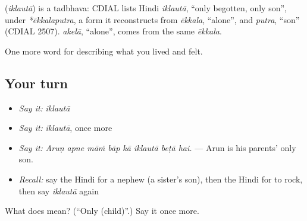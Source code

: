 \begin{cousinweb}
\textbf{} (\emph{iklautā}) is a tadbhava: CDIAL lists Hindi \emph{iklautā}, \textquotedblleft{}only begotten, only son\textquotedblright{}, under \emph{*ēkkalaputra}, a form it reconstructs from \emph{ēkkala}, \textquotedblleft{}alone\textquotedblright{}, and \emph{putra}, \textquotedblleft{}son\textquotedblright{} (CDIAL 2507). \emph{akelā}, \textquotedblleft{}alone\textquotedblright{}, comes from the same \emph{ēkkala}.
\end{cousinweb}

\begin{grammarlens}[title={What you've built}]
One more word for describing what you lived and felt.
\end{grammarlens}

\subsection*{Your turn}
\begin{itemize}
\raggedright
  \item \emph{Say it:} \emph{iklautā}
  \item \emph{Say it:} \emph{iklautā}, once more
  \item \emph{Say it:} \emph{Aruṇ apne māṁ bāp kā iklautā beṭā hai.} — Arun is his parents' only son.
  \item \emph{Recall:} say the Hindi for a nephew (a sister's son), then the Hindi for to rock, then say \emph{iklautā} again
\end{itemize}

\begin{tcolorbox}[breakable,colback=teal!4,colframe=teal!35!black,title={Before you move on}]
What does  mean? (\textquotedblleft{}Only (child)\textquotedblright{}.) Say it once more.
\end{tcolorbox}
